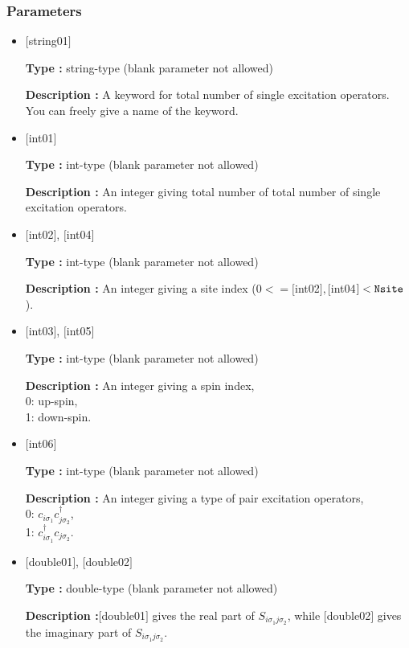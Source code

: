 \subsubsection{Parameters}
 \begin{itemize}

   \item  $[$string01$]$
   
    {\bf Type :} string-type (blank parameter not allowed)

   {\bf Description :} A keyword for total number of single excitation operators. You can freely give a name of the keyword.

   \item  $[$int01$]$
   
    {\bf Type :} int-type (blank parameter not allowed)

   {\bf Description :} An integer giving total number of total number of single excitation operators.

  \item  $[$int02$]$, $[$int04$]$

 {\bf Type :} int-type (blank parameter not allowed)

{\bf Description :} An integer giving a site index ($0<= [$int02$], [$int04$]<\verb|Nsite|$).
 
 
  \item  $[$int03$]$, $[$int05$]$

 {\bf Type :} int-type (blank parameter not allowed)

{\bf Description :} 
An integer giving a spin index,\\
0: up-spin,\\
1: down-spin.

\item  $[$int06$]$

 {\bf Type :} int-type (blank parameter not allowed)

{\bf Description :} 
An integer giving a type of pair excitation operators,\\
0: $ c_{i\sigma_1}c_{j\sigma_2}^{\dagger}$,\\
1: $ c_{i\sigma_1}^{\dagger}c_{j\sigma_2}$.

\item  $[$double01$]$, $[$double02$]$

 {\bf Type :} double-type (blank parameter not allowed)

{\bf Description :}$[$double01$]$ gives the real part of $S_{i\sigma_1j\sigma_2}$, while $[$double02$]$ gives the imaginary part of $S_{i\sigma_1j\sigma_2}$.

\end{itemize}

